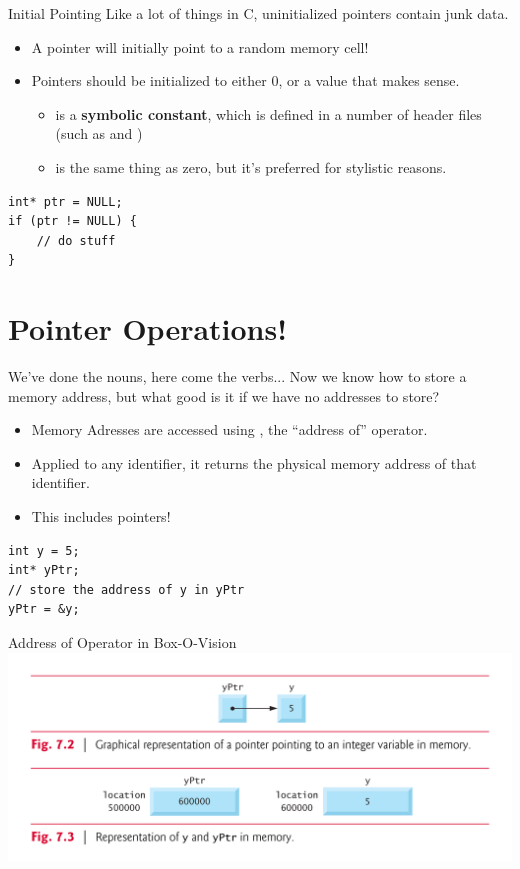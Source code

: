 \documentclass[11pt]{beamer}
\let\OldTexttt\texttt
\renewcommand{\texttt}[1]{\OldTexttt{\color{teal}{#1}}}
\begin{document}
\begin{frame}[fragile=singleslide]{Initial Pointing}
Like a lot of things in C, uninitialized pointers contain junk data.  
\begin{itemize}
\item A pointer will initially point to a random memory cell! 
\item Pointers should be initialized to either 0, \texttt{NULL} or a value that makes sense.
\begin{itemize}
\item \texttt{NULL} is a \textbf{symbolic constant}, which is defined in a number of header files (such as \texttt{stdio.h} and \texttt{ stddef.h})
\item \texttt{NULL} is the same thing as zero, but it's preferred for stylistic reasons.
\end{itemize}
\end{itemize}
\begin{lstlisting}[style = C]
int* ptr = NULL;
if (ptr != NULL) {
	// do stuff
}
\end{lstlisting}
\end{frame}

\section[Operations]{Pointer Operations!}
\begin{frame}[fragile=singleslide]{We've done the nouns, here come the verbs...}
Now we know how to store a memory address, but what good is it if we have no addresses to store?
\begin{itemize}
\item Memory Adresses are accessed using \texttt{\&}, the ``address of'' operator.
\item Applied to any identifier, it returns the physical memory address of that identifier. 
\item This includes pointers! 
\end{itemize}
\begin{lstlisting}[style = C]
int y = 5;
int* yPtr;
// store the address of y in yPtr
yPtr = &y;
\end{lstlisting}
\end{frame}

\begin{frame}{Address of Operator in Box-O-Vision}
\center
\includegraphics[scale=0.12]{tbb.png}
\end{frame}
\end{document}
